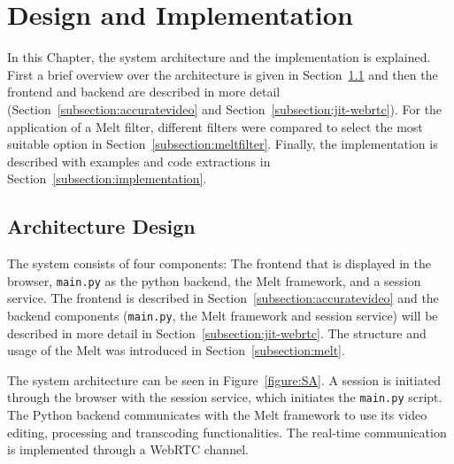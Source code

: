 \documentclass[../MasterThesis.tex]{subfiles}
\begin{document}
	
	
	
%
%
%
%
%
%
%
%
\newpage
\section{Design and Implementation} \label{section:designandimplementation}

In this Chapter, the system architecture and the implementation is explained. First a brief overview over the architecture is given in Section~\ref{subsection:architecturedesign} and then the frontend and backend are described in more detail (Section~\ref{subsection:accuratevideo} and Section~\ref{subsection:jit-webrtc}).
For the application of a Melt filter, different filters were compared to select the most suitable option in Section~\ref{subsection:meltfilter}. Finally, the implementation is described with examples and code extractions in Section~\ref{subsection:implementation}.





\subsection{Architecture Design} \label{subsection:architecturedesign}


The system consists of four components: The frontend that is displayed in the browser, \texttt{main.py} as the python backend, the Melt framework, and a session service. The frontend is described in Section~\ref{subsection:accuratevideo} and the backend components (\texttt{main.py}, the Melt framework and session service) will be described in more detail in Section~\ref{subsection:jit-webrtc}. The structure and usage of the Melt was introduced in Section~\ref{subsection:melt}.


The system architecture can be seen in Figure~\ref{figure:SA}.
A session is initiated through the browser with the session service, which initiates the \texttt{main.py} script.
The Python backend communicates with the Melt framework to use its video editing, processing and transcoding functionalities. The real-time communication is implemented through a WebRTC channel.
\end{document}
